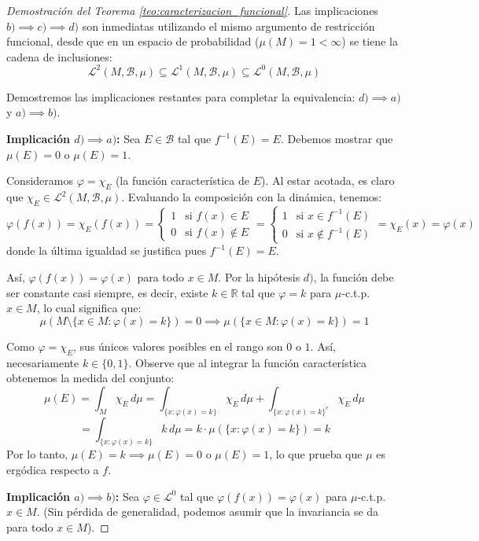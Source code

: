 \begin{proof}[Demostración del Teorema \ref{teo:caracterizacion_funcional}]
	Las implicaciones $b) \implies c) \implies d)$ son inmediatas utilizando el mismo argumento de restricción funcional, desde que en un espacio de probabilidad ($\mu(M) = 1 < \infty$) se tiene la cadena de inclusiones:
	$$ \mathcal{L}^2(M, \mathcal{B}, \mu) \subseteq \mathcal{L}^1(M, \mathcal{B}, \mu) \subseteq \mathcal{L}^0(M, \mathcal{B}, \mu) $$
	
	Demostremos las implicaciones restantes para completar la equivalencia: $d) \implies a)$ y $a) \implies b)$.
	
	\textbf{Implicación $d) \implies a)$:}
	Sea $E \in \mathcal{B}$ tal que $f^{-1}(E) = E$. Debemos mostrar que $\mu(E) = 0$ o $\mu(E) = 1$.
	
	Consideramos $\varphi = \chi_E$ (la función característica de $E$). Al estar acotada, es claro que $\chi_E \in \mathcal{L}^2(M, \mathcal{B}, \mu)$.
	Evaluando la composición con la dinámica, tenemos:
	$$ \varphi(f(x)) = \chi_E(f(x)) = \begin{cases} 1 & \text{si } f(x) \in E \\ 0 & \text{si } f(x) \notin E \end{cases} = \begin{cases} 1 & \text{si } x \in f^{-1}(E) \\ 0 & \text{si } x \notin f^{-1}(E) \end{cases} = \chi_E(x) = \varphi(x) $$
	donde la última igualdad se justifica pues $f^{-1}(E) = E$.
	
	Así, $\varphi(f(x)) = \varphi(x)$ para todo $x \in M$. Por la hipótesis $d)$, la función debe ser constante casi siempre, es decir, existe $k \in \mathbb{R}$ tal que $\varphi = k$ para $\mu$-c.t.p. $x \in M$, lo cual significa que:
	$$ \mu(M \setminus \{x \in M : \varphi(x) = k\}) = 0 \implies \mu(\{x \in M : \varphi(x) = k\}) = 1 $$
	
	Como $\varphi = \chi_E$, sus únicos valores posibles en el rango son $0$ o $1$. Así, necesariamente $k \in \{0, 1\}$.
	Observe que al integrar la función característica obtenemos la medida del conjunto:
	$$ \mu(E) = \int_M \chi_E \, d\mu = \int_{\{x : \varphi(x)=k\}} \chi_E \, d\mu + \int_{\{x : \varphi(x)=k\}^c} \chi_E \, d\mu $$ $$= \int_{\{x : \varphi(x)=k\}} k \, d\mu = k \cdot \mu(\{x : \varphi(x)=k\}) = k $$
	Por lo tanto, $\mu(E) = k \implies \mu(E) = 0$ o $\mu(E) = 1$, lo que prueba que $\mu$ es ergódica respecto a $f$.
	
	\textbf{Implicación $a) \implies b)$:}
	Sea $\varphi \in \mathcal{L}^0$ tal que $\varphi(f(x)) = \varphi(x)$ para $\mu$-c.t.p. $x \in M$. (Sin pérdida de generalidad, podemos asumir que la invariancia se da para todo $x \in M$).
	

\end{proof}
